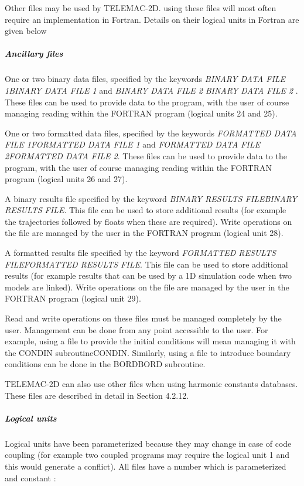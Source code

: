 \documentclass{article} %
\begin{document}
 Other files may be used by TELEMAC-2D. using these files will most often require an implementation in Fortran. Details on their logical units in Fortran are given below


\subparagraph{ Ancillary files}

 One or two binary data files, specified by the keywords \textit{BINARY DATA FILE 1BINARY DATA FILE 1 } and \textit{BINARY DATA FILE 2} \textit{BINARY DATA FILE 2 }. These files can be used to provide data to the program, with the user of course managing reading within the FORTRAN program (logical units 24 and 25).

 One or two formatted data files, specified by the keywords \textit{FORMATTED DATA FILE 1FORMATTED DATA FILE 1} and \textit{FORMATTED DATA FILE 2FORMATTED DATA FILE 2}.  These files can be used to provide data to the program, with the user of course managing reading within the FORTRAN program (logical units 26 and 27).

 A binary results file specified by the keyword \textit{BINARY RESULTS FILEBINARY RESULTS FILE}. This file can be used to store additional results (for example the trajectories followed by floats when these are required). Write operations on the file are managed by the user in the FORTRAN program (logical unit 28).

 A formatted results file specified by the keyword \textit{FORMATTED RESULTS FILEFORMATTED RESULTS FILE}. This file can be used to store additional results (for example results that can be used by a 1D simulation code when two models are linked). Write operations on the file are managed by the user in the FORTRAN program (logical unit 29).

 Read and write operations on these files must be managed completely by the user. Management can be done from any point accessible to the user. For example, using a file to provide the initial conditions will mean managing it with the CONDIN subroutineCONDIN. Similarly, using a file to introduce boundary conditions can be done in the BORDBORD subroutine.

 TELEMAC-2D can also use other files when using harmonic constants databases. These files are described in detail in Section 4.2.12.


\subparagraph{ Logical units}

 Logical units have been parameterized because they may change in case of code coupling (for example two coupled programs may require the logical unit 1 and this would generate a conflict). All files have a number which is parameterized and constant :
\end{document}
